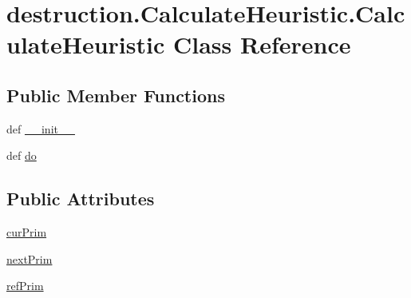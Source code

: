 \hypertarget{classdestruction_1_1_calculate_heuristic_1_1_calculate_heuristic}{\section{destruction.\-Calculate\-Heuristic.\-Calculate\-Heuristic Class Reference}
\label{classdestruction_1_1_calculate_heuristic_1_1_calculate_heuristic}
}
\subsection*{Public Member Functions}
\begin{DoxyCompactItemize}
\item 
def \hyperlink{classdestruction_1_1_calculate_heuristic_1_1_calculate_heuristic_afca2ef7d90a1664e8f55a87e2eee3ede}{\-\_\-\-\_\-init\-\_\-\-\_\-}
\item 
def \hyperlink{classdestruction_1_1_calculate_heuristic_1_1_calculate_heuristic_a11574b4dc06da674380abdadfd1ac898}{do}
\end{DoxyCompactItemize}
\subsection*{Public Attributes}
\begin{DoxyCompactItemize}
\item 
\hyperlink{classdestruction_1_1_calculate_heuristic_1_1_calculate_heuristic_a5433d054c262cf5acf995d6e4ec9e3f6}{cur\-Prim}
\item 
\hyperlink{classdestruction_1_1_calculate_heuristic_1_1_calculate_heuristic_af8cbd1b9702423eb2eb63e67a6069d1a}{next\-Prim}
\item 
\hyperlink{classdestruction_1_1_calculate_heuristic_1_1_calculate_heuristic_abf84d894d5f7bc0b6b992f1643e3cc06}{ref\-Prim}
\end{DoxyCompactItemize}


